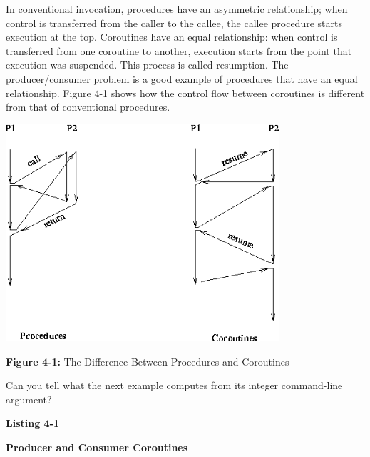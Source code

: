 In conventional invocation, procedures have an asymmetric
relationship; when control is transferred from the caller to the
callee, the callee procedure starts execution at the top. Coroutines
have an equal relationship: when control is transferred from one
coroutine to another, execution starts from the point that
execution was suspended. This process is called resumption. The
producer/consumer problem is a good example of
procedures that have an equal relationship. Figure 4-1 shows how the
control flow between coroutines is different from that of conventional
procedures.

{\centering \par}

\begin{center}
\includegraphics[width=3.9902in,height=3.1701in]{ub-img/ub-img8.png}
\end{center}

{\sffamily\bfseries Figure 4-1:}
{\sffamily The Difference Between Procedures and Coroutines}

\bigskip

Can you tell what the next example computes from its integer
command-line argument?

\bigskip

{\sffamily\bfseries
Listing 4-1}

{\sffamily\bfseries
Producer and Consumer Coroutines}

